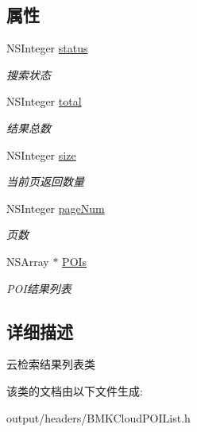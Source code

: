 \subsection*{属性}
\begin{DoxyCompactItemize}
\item 
\hypertarget{interface_b_m_k_cloud_p_o_i_list_a9a0761aa32216b6d96a3f3d538d8f2db}{}N\+S\+Integer \hyperlink{interface_b_m_k_cloud_p_o_i_list_a9a0761aa32216b6d96a3f3d538d8f2db}{status}\label{interface_b_m_k_cloud_p_o_i_list_a9a0761aa32216b6d96a3f3d538d8f2db}

\begin{DoxyCompactList}\small\item\em 搜索状态 \end{DoxyCompactList}\item 
\hypertarget{interface_b_m_k_cloud_p_o_i_list_a71aa046e96ad04026feb159383d3f615}{}N\+S\+Integer \hyperlink{interface_b_m_k_cloud_p_o_i_list_a71aa046e96ad04026feb159383d3f615}{total}\label{interface_b_m_k_cloud_p_o_i_list_a71aa046e96ad04026feb159383d3f615}

\begin{DoxyCompactList}\small\item\em 结果总数 \end{DoxyCompactList}\item 
\hypertarget{interface_b_m_k_cloud_p_o_i_list_a2d38d103dd34862c538ed99a635aafb5}{}N\+S\+Integer \hyperlink{interface_b_m_k_cloud_p_o_i_list_a2d38d103dd34862c538ed99a635aafb5}{size}\label{interface_b_m_k_cloud_p_o_i_list_a2d38d103dd34862c538ed99a635aafb5}

\begin{DoxyCompactList}\small\item\em 当前页返回数量 \end{DoxyCompactList}\item 
\hypertarget{interface_b_m_k_cloud_p_o_i_list_a1301275f0561c350c223dcf838502df8}{}N\+S\+Integer \hyperlink{interface_b_m_k_cloud_p_o_i_list_a1301275f0561c350c223dcf838502df8}{page\+Num}\label{interface_b_m_k_cloud_p_o_i_list_a1301275f0561c350c223dcf838502df8}

\begin{DoxyCompactList}\small\item\em 页数 \end{DoxyCompactList}\item 
\hypertarget{interface_b_m_k_cloud_p_o_i_list_a682ea5efc9695565e9ceacc9553d436d}{}N\+S\+Array $\ast$ \hyperlink{interface_b_m_k_cloud_p_o_i_list_a682ea5efc9695565e9ceacc9553d436d}{P\+O\+Is}\label{interface_b_m_k_cloud_p_o_i_list_a682ea5efc9695565e9ceacc9553d436d}

\begin{DoxyCompactList}\small\item\em P\+O\+I结果列表 \end{DoxyCompactList}\end{DoxyCompactItemize}


\subsection{详细描述}
云检索结果列表类 

该类的文档由以下文件生成\+:\begin{DoxyCompactItemize}
\item 
output/headers/B\+M\+K\+Cloud\+P\+O\+I\+List.\+h\end{DoxyCompactItemize}
